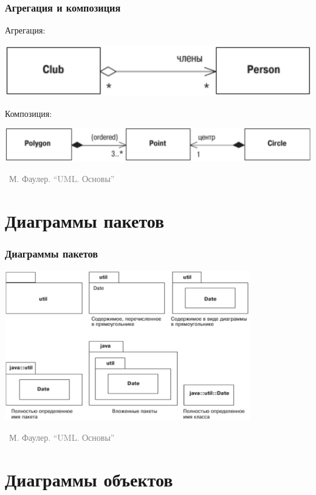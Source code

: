 \documentclass[xetex,mathserif,serif]{beamer}
\newcommand{\attribution}[1] {
    \vspace{-5mm}\begin{flushright}\begin{scriptsize}\textcolor{gray}{\textcopyright\, #1}\end{scriptsize}\end{flushright}
}
\begin{document}
    \begin{frame}
        \frametitle{Агрегация и композиция}
        Агрегация:
        \begin{center}
            \includegraphics[height=0.1\textheight]{aggregation.png}
        \end{center}
        \vspace{5mm}
        Композиция:
        \begin{center}
            \includegraphics[height=0.1\textheight]{composition.png}
        \end{center}
        \attribution{М. Фаулер. ``UML. Основы''}
    \end{frame}

    \section{Диаграммы пакетов}

    \begin{frame}
        \frametitle{Диаграммы пакетов}
        \begin{center}
            \includegraphics[width=0.8\textwidth]{packageDiagrams.png}
            \attribution{М. Фаулер. ``UML. Основы''}
        \end{center}
    \end{frame}

    \section{Диаграммы объектов}
\end{document}
